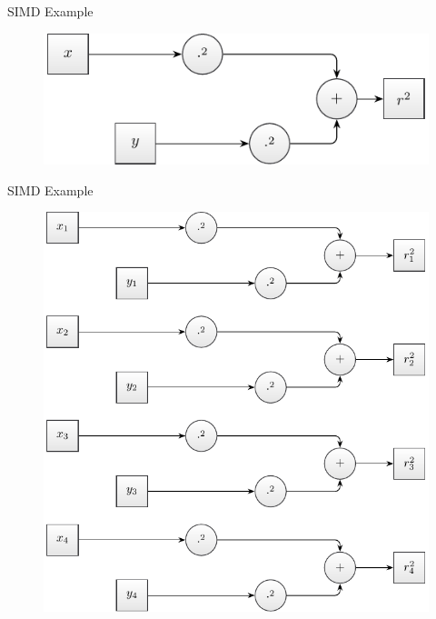 \documentclass[aspectratio=169]{beamer}
\begin{document}
    \begin{frame}{SIMD Example}
      \begin{figure}
        \includegraphics[scale=0.9]{figures/radius_operation.pdf}
      \end{figure}
    \end{frame}

    \begin{frame}{SIMD Example}
      \begin{figure}
        \includegraphics[scale=0.6]{figures/radius_operation_x4.pdf}
      \end{figure}
    \end{frame}
\end{document}
